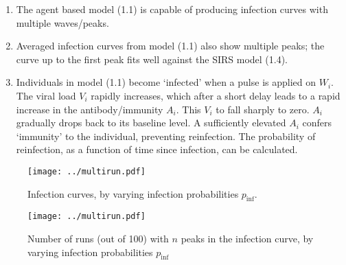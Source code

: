 \documentclass[11pt]{article}
\begin{document}
    \begin{enumerate}
        \item The agent based model (1.1) is capable of producing infection
        curves with multiple waves/peaks.

        \item Averaged infection curves from model (1.1) also show multiple
        peaks; the curve up to the first peak fits well against the SIRS model
        (1.4).

        \item Individuals in model (1.1) become `infected' when a pulse is
        applied on $W_i$. The viral load $V_i$ rapidly increases, which after
        a short delay leads to a rapid increase in the antibody/immunity
        $A_i$. This $V_i$ to fall sharply to zero. $A_i$ gradually drops back
        to its baseline level. A sufficiently elevated $A_i$ confers
        `immunity' to the individual, preventing reinfection. The probability
        of reinfection, as a function of time since infection, can be
        calculated.
    \end{enumerate}


    \begin{figure}[h!]
    \begin{center}
        \texttt{[image: ../multirun.pdf]}
    \end{center}
    \caption{Infection curves, by varying infection probabilities
    $p_\text{inf}$.}
    \label{fig:multiruns}
    \end{figure}


    \begin{figure}[h!]
    \begin{center}
        \texttt{[image: ../multirun.pdf]}
    \end{center}
    \caption{Number of runs (out of 100) with $n$ peaks in the infection
    curve, by varying infection probabilities $p_\text{inf}$}
    \label{fig:peaks}
    \end{figure}
\end{document}
